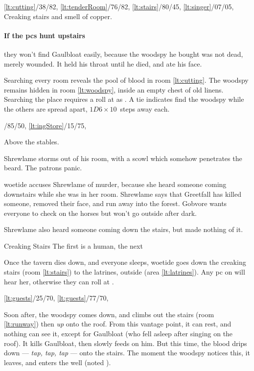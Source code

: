 \documentclass[10pt,twoside]{book}
\begin{document}
%
  {%
    \ref{lt:cutting}/38/82,
    \ref{lt:tenderRoom}/76/82,
    \ref{lt:stairs}/80/45,
    \ref{lt:singer}/07/05,
  }%
  {Creaking stairs and smell of copper.
  }

\paragraph{If the \glspl{pc} hunt upstairs}
they won't find Gaulbloat easily, because the \gls{woodspy} he bought was not dead, merely wounded.
It held his throat until he died, and ate his face.

Searching every room reveals the pool of blood in room \vref{lt:cutting}.
The \gls{woodspy} remains hidden in room \vref{lt:woodspy}, inside an empty chest of old linens.
Searching the place requires a  roll at \tn[12] as .
A tie indicates  find the \gls{woodspy} while the others are spread apart, $1D6 \times 10$~\glspl{step} away each.

%
  {%
    /85/50,%
    \ref{lt:ingStore}/15/75,
  }%
  {Above the stables.\par}

Shrewlame storms out of his room, with a scowl which somehow penetrates the beard.
The patrons panic.

\Gls{woetide} accuses Shrewlame of murder, because she heard someone coming downstairs while she was in her room.
Shrewlame says that Greetfall has killed someone, removed their face, and run away into the forest.
Gobvore wants everyone to check on the horses but won't go outside after dark.

Shrewlame also heard someone coming down the stairs, but made nothing of it.

{Creaking Stairs}%
{The first is a human, the next }%

Once the tavern dies down, and everyone sleeps, \gls{woetide} goes down the creaking stairs (room \ref{lt:stairs}) to the latrines, outside (area \ref{lt:latrines}).
Any \gls{pc} on  will hear her, otherwise they can roll  at \tn[12].

%
  {%
    \ref{lt:guests}/25/70,
    \ref{lt:guests}/77/70,
  }%
  {}

Soon after, the \gls{woodspy} comes down, and climbs out the stairs (room \ref{lt:runway}) then \emph{up} onto the roof.
From this vantage point, it can rest, and nothing can see it, except for Gaulbloat (who fell asleep after singing on the roof).
It kills Gaulbloat, then slowly feeds on him.
But this time, the blood drips down --- \textit{tap, tap, tap} --- onto the stairs.
The moment the \gls{woodspy} notices this, it leaves, and enters the well (noted ).
\end{document}
